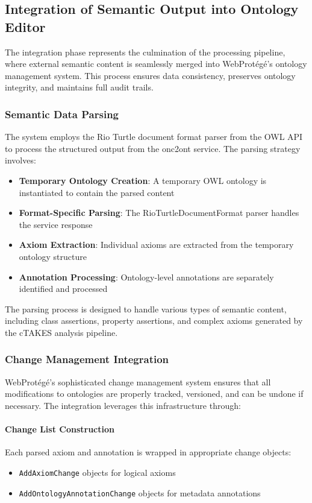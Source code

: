 \subsection{Integration of Semantic Output into Ontology Editor}

The integration phase represents the culmination of the processing pipeline, where external semantic content is seamlessly merged into WebProtégé's ontology management system. This process ensures data consistency, preserves ontology integrity, and maintains full audit trails.

\subsubsection{Semantic Data Parsing}

The system employs the Rio Turtle document format parser from the OWL API to process the structured output from the onc2ont service. The parsing strategy involves:

\begin{itemize}
\item \textbf{Temporary Ontology Creation}: A temporary OWL ontology is instantiated to contain the parsed content
\item \textbf{Format-Specific Parsing}: The RioTurtleDocumentFormat parser handles the service response
\item \textbf{Axiom Extraction}: Individual axioms are extracted from the temporary ontology structure
\item \textbf{Annotation Processing}: Ontology-level annotations are separately identified and processed
\end{itemize}

The parsing process is designed to handle various types of semantic content, including class assertions, property assertions, and complex axioms generated by the cTAKES analysis pipeline.

\subsubsection{Change Management Integration}

WebProtégé's sophisticated change management system ensures that all modifications to ontologies are properly tracked, versioned, and can be undone if necessary. The integration leverages this infrastructure through:

\paragraph{Change List Construction}
Each parsed axiom and annotation is wrapped in appropriate change objects:
\begin{itemize}
\item \texttt{AddAxiomChange} objects for logical axioms
\item \texttt{AddOntologyAnnotationChange} objects for metadata annotations
\end{itemize}

